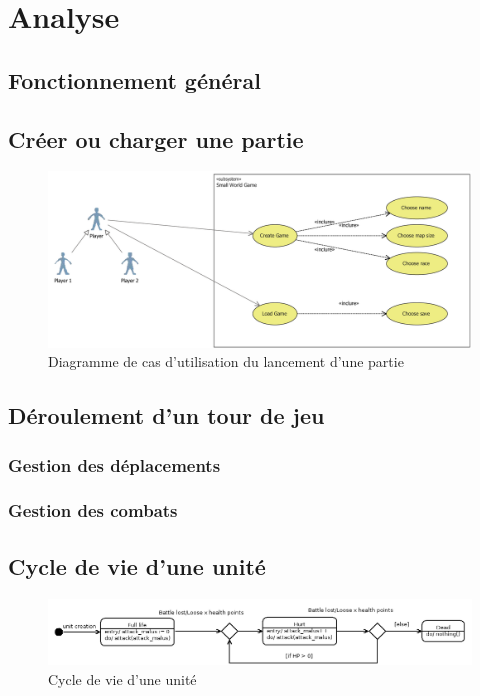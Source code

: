 \section{Analyse}

\subsection{Fonctionnement général}

\subsection{Créer ou charger une partie}

\begin{figure}[h]
  \centering
  \includegraphics[width=13cm]{schemas/uc_game_creation.png} 
  \caption{Diagramme de cas d'utilisation du lancement d'une partie} 
  \label{uc_game_creation}
\end{figure} 


\subsection{Déroulement d'un tour de jeu}
\subsubsection{Gestion des déplacements}
\subsubsection{Gestion des combats}

\subsection{Cycle de vie d'une unité}

\begin{figure}[!h] 
  \centering
  \includegraphics[width=13cm]{schemas/state-diagram.png} 
  \caption{Cycle de vie d'une unité} 
  \label{state-diagram}
\end{figure} 


